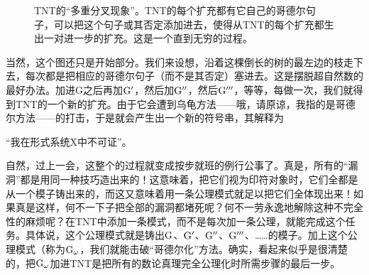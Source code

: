 \begin{figure}
\caption[TNT的“多重分叉现象”。]
  {TNT的“多重分叉现象”。TNT的每个扩充都有它自己的哥德尔句子，可以把这个句子或其否定添加进去，使得从TNT的每个扩充都生出一对进一步的扩充。这是一个直到无穷的过程。}
\end{figure}

当然，这个图还只是开始部分。我们来设想，沿着这棵倒长的树的最左边的枝走下去，每次都是把相应的哥德尔句子（而不是其否定）塞进去。这是摆脱超自然数的最好办法。加进G之后再加$\mathrm { G }'$，然后加$\mathrm { G }''$，然后$\mathrm { G }'''$，等等，每做一次，我们就得到TNT的一个新的扩充。由于它会遭到乌龟方法——哦，请原谅，我指的是哥德尔方法——的打击，于是就会产生出一个新的符号串，其解释为

\begin{block}
“我在形式系统X中不可证”。
\end{block}

自然，过上一会，这整个的过程就变成按步就班的例行公事了。真是，所有的“漏洞”都是用同一种技巧造出来的！这意味着，把它们视为印符对象时，它们全都是从一个模子铸出来的，而这又意味着用一条公理模式就足以把它们全体现出来！如果真是这样，何不一下子把全部的漏洞都堵死呢？何不一劳永逸地解除这种不完全性的麻烦呢？在TNT中添加一条模式，而不是每次加一条公理，就能完成这个任务。具体说，这个公理模式就是铸出$\mathrm { G }$、$\mathrm { G }'$、$\mathrm { G }''$、$\mathrm { G }'''$、……的模子。加上这个公理模式（称为$\mathrm { G }_\omega$，我们就能击破“哥德尔化”方法。确实，看起来似乎是很清楚的，把$\mathrm { G }_\omega$加进TNT是把所有的数论真理完全公理化时所需步骤的最后一步。


